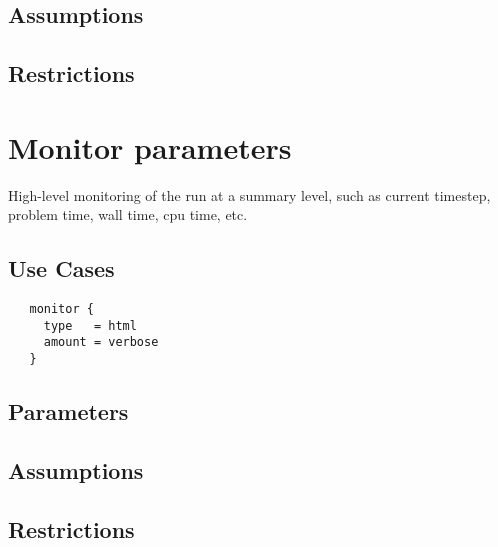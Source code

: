 \documentclass{book}
\begin{document}
\subsection{Assumptions}
\subsection{Restrictions}

\section{Monitor parameters} \label{s:performance}

High-level monitoring of the run at a summary level, such as current
timestep, problem time, wall time, cpu time, etc.

\subsection{Use Cases}
\begin{verbatim}
   monitor {
     type   = html
     amount = verbose
   }
\end{verbatim}
\subsection{Parameters}
\subsection{Assumptions}
\subsection{Restrictions}
\end{document}
